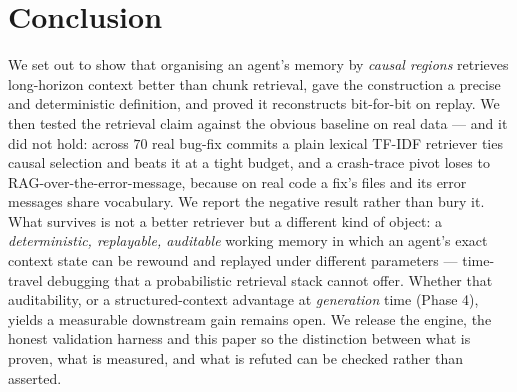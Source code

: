 \documentclass[11pt]{article}
\begin{document}
\section{Conclusion}

We set out to show that organising an agent's memory by \emph{causal regions}
retrieves long-horizon context better than chunk retrieval, gave the construction
a precise and deterministic definition, and proved it reconstructs bit-for-bit on
replay. We then tested the retrieval claim against the obvious baseline on real
data --- and it did not hold: across $70$ real bug-fix commits a plain lexical
TF-IDF retriever ties causal selection and beats it at a tight budget, and a
crash-trace pivot loses to RAG-over-the-error-message, because on real code a
fix's files and its error messages share vocabulary. We report the negative result
rather than bury it. What survives is not a better retriever but a different kind
of object: a \emph{deterministic, replayable, auditable} working memory in which an
agent's exact context state can be rewound and replayed under different
parameters --- time-travel debugging that a probabilistic retrieval stack cannot
offer. Whether that auditability, or a structured-context advantage at
\emph{generation} time (Phase 4), yields a measurable downstream gain remains open.
We release the engine, the honest validation harness and this paper so the
distinction between what is proven, what is measured, and what is refuted can be
checked rather than asserted.
\end{document}
